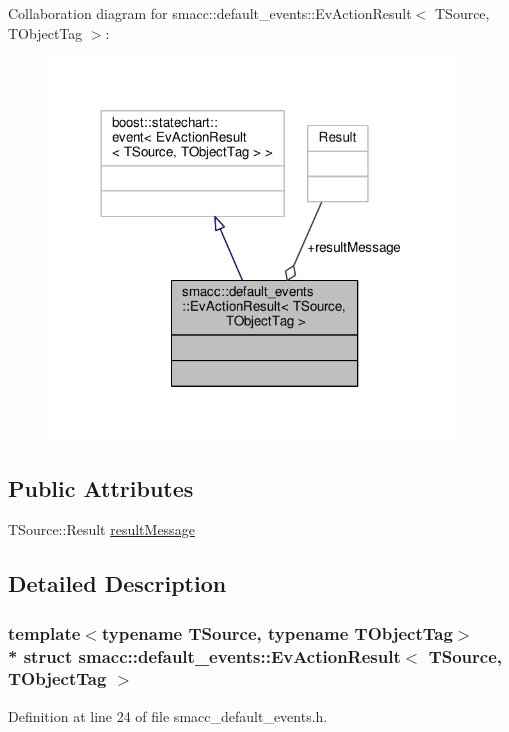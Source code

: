 Collaboration diagram for smacc\+:\+:default\+\_\+events\+:\+:Ev\+Action\+Result$<$ T\+Source, T\+Object\+Tag $>$\+:\nopagebreak
\begin{figure}[H]
\begin{center}
\leavevmode
\includegraphics[width=305pt]{structsmacc_1_1default__events_1_1EvActionResult__coll__graph}
\end{center}
\end{figure}
\subsection*{Public Attributes}
\begin{DoxyCompactItemize}
\item 
T\+Source\+::\+Result \hyperlink{structsmacc_1_1default__events_1_1EvActionResult_a446603e4d43ded6c16a7abba1bf8bfcd}{result\+Message}
\end{DoxyCompactItemize}


\subsection{Detailed Description}
\subsubsection*{template$<$typename T\+Source, typename T\+Object\+Tag$>$\\*
struct smacc\+::default\+\_\+events\+::\+Ev\+Action\+Result$<$ T\+Source, T\+Object\+Tag $>$}



Definition at line 24 of file smacc\+\_\+default\+\_\+events.\+h.



